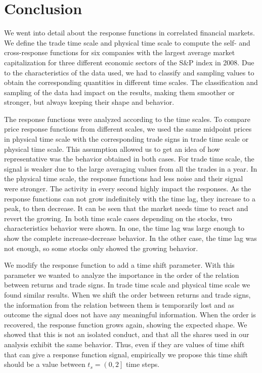 \section{Conclusion}\label{sec:conclusion}

We went into detail about the response functions in correlated financial
markets. We define the trade time scale and physical time scale to compute the
self- and cross-response functions for six companies with the largest average
market capitalization for three different economic sectors of the S\&P index
in 2008.
Due to the characteristics of the data used, we had to classify and sampling
values to obtain the corresponding quantities in different time scales.
The classification and sampling of the data had impact on the results, making
them smoother or stronger, but always keeping their shape and behavior.

The response functions were analyzed according to the time scales. To compare
price response functions from different scales, we used the same midpoint
prices in physical time scale with the corresponding trade signs in trade time
scale or physical time scale. This assumption allowed us to get an idea of how
representative was the behavior obtained in both cases. For trade time scale,
the signal is weaker due to the large averaging values from all the trades in a
year. In the physical time scale, the response functions had less noise and
their signal were stronger. The activity in every second highly impact the
responses. As the response functions can not grow indefinitely with the time
lag, they increase to a peak, to then decrease. It can be seen that the market
needs time to react and revert the growing. In both time scale cases depending
on the stocks, two characteristics behavior were shown. In one, the time lag
was large enough to show the complete increase-decrease behavior. In the other
case, the time lag was not enough, so some stocks only showed the growing
behavior.

We modify the response function to add a time shift parameter. With this
parameter we wanted to analyze the importance in the order of the relation
between returns and trade signs. In trade time scale and physical time scale we
found similar results. When we shift the order between returns and trade signs,
the information from the relation between them is temporarily lost and as
outcome the signal does not have any meaningful information. When the order is
recovered, the response function grows again, showing the expected shape.
We showed that this is not an isolated conduct, and that all the shares used in
our analysis exhibit the same behavior. Thus, even if they are values of time
shift that can give a response function signal, empirically we propose this
time shift should be a value between $t_{s} = \left(0,2\right]$ time steps.

